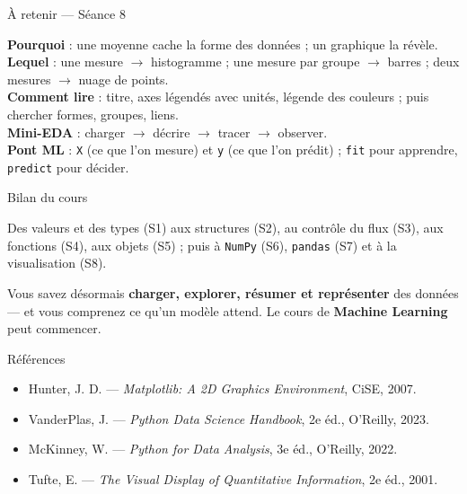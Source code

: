 \documentclass[aspectratio=169,11pt]{beamer}
\begin{document}
\begin{frame}{À retenir — Séance 8}
\begin{ucadret}[L'essentiel]
{\small
\textbf{Pourquoi} : une moyenne cache la forme des données ; un graphique la révèle.\\[3pt]
\textbf{Lequel} : une mesure $\rightarrow$ histogramme ; une mesure par groupe $\rightarrow$ barres ; deux mesures $\rightarrow$ nuage de points.\\[3pt]
\textbf{Comment lire} : titre, axes légendés avec unités, légende des couleurs ; puis chercher formes, groupes, liens.\\[3pt]
\textbf{Mini-EDA} : charger $\rightarrow$ décrire $\rightarrow$ tracer $\rightarrow$ observer.\\[3pt]
\textbf{Pont ML} : \texttt{X} (ce que l'on mesure) et \texttt{y} (ce que l'on prédit) ; \texttt{fit} pour apprendre, \texttt{predict} pour décider.}
\end{ucadret}
\end{frame}

\begin{frame}{Bilan du cours}
\begin{ucaddef}
{\small Des valeurs et des types (S1) aux structures (S2), au contrôle du flux (S3), aux fonctions (S4), aux objets (S5) ; puis à \texttt{NumPy} (S6), \texttt{pandas} (S7) et à la visualisation (S8).}
\end{ucaddef}
{\small Vous savez désormais \textbf{charger, explorer, résumer et représenter} des données — et vous comprenez ce qu'un modèle attend. Le cours de \textbf{Machine Learning} peut commencer.}
\end{frame}

\begin{frame}{Références}
\begin{itemize}\small
  \item Hunter, J. D. — \emph{Matplotlib: A 2D Graphics Environment}, CiSE, 2007.
  \item VanderPlas, J. — \emph{Python Data Science Handbook}, 2e éd., O'Reilly, 2023.
  \item McKinney, W. — \emph{Python for Data Analysis}, 3e éd., O'Reilly, 2022.
  \item Tufte, E. — \emph{The Visual Display of Quantitative Information}, 2e éd., 2001.
\end{itemize}
\end{frame}
\end{document}
